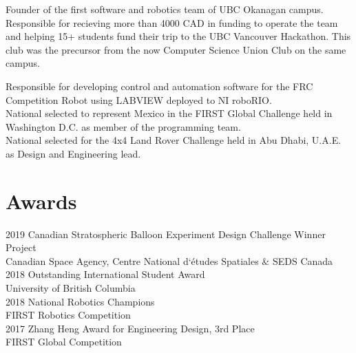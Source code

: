 \documentclass[]{resume-openfont}
\begin{document}
\begin{minipage}[t]{0.66\textwidth}
Founder of the first software and robotics team of UBC Okanagan campus. Responsible for recieving more than 4000 CAD in funding to operate the team and helping 15+ students fund their trip to the UBC Vancouver Hackathon. This club was the precursor from the now Computer Science Union Club on the same campus.
\sectionsep

Responsible for developing control and automation software for the FRC Competition Robot using LABVIEW deployed to NI roboRIO.  \\ National selected to represent Mexico in the FIRST Global Challenge held in Washington D.C. as member of the programming team.\\ National selected for the 4x4 Land Rover Challenge held in Abu Dhabi, U.A.E. as Design and Engineering lead.

\section{Awards}
2019 Canadian Stratospheric Balloon Experiment Design Challenge Winner Project \\
\textbullet{} Canadian Space Agency, Centre National d`études Spatiales \& SEDS Canada \\
2018 Outstanding International Student Award\\
\textbullet{} University of British Columbia\\
2018 National Robotics Champions\\
\textbullet{} FIRST Robotics Competition\\
2017 Zhang Heng Award for Engineering Design, 3rd Place\\
\textbullet{} FIRST Global Competition

\sectionsep


\end{minipage}
\end{document}
